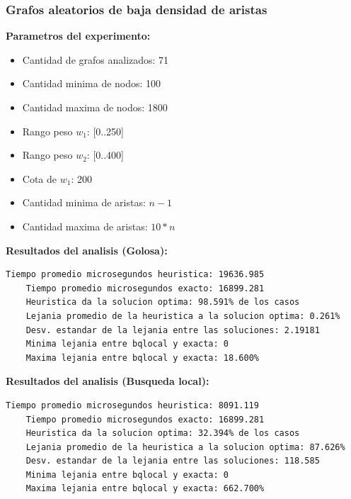 \subsubsection{Grafos aleatorios de baja densidad de aristas}
\textbf{Parametros del experimento:}
\begin{itemize}
	\item Cantidad de grafos analizados: 71
	\item Cantidad minima de nodos: 100
	\item Cantidad maxima de nodos: 1800
	\item Rango peso $w_1$: [0..250]
	\item Rango peso $w_2$: [0..400]
	\item Cota de $w_1$: 200
	\item Cantidad minima de aristas: $n-1$
	\item Cantidad maxima de aristas: $10*n$
\end{itemize}

\vspace{1cm}

\textbf{Resultados del analisis (Golosa):}
\begin{lstlisting}[frame=single]	
	Tiempo promedio microsegundos heuristica: 19636.985
	Tiempo promedio microsegundos exacto: 16899.281
	Heuristica da la solucion optima: 98.591% de los casos
	Lejania promedio de la heuristica a la solucion optima: 0.261%
	Desv. estandar de la lejania entre las soluciones: 2.19181
	Minima lejania entre bqlocal y exacta: 0
	Maxima lejania entre bqlocal y exacta: 18.600%
\end{lstlisting}

\textbf{Resultados del analisis (Busqueda local):}
\begin{lstlisting}[frame=single]	
	Tiempo promedio microsegundos heuristica: 8091.119
	Tiempo promedio microsegundos exacto: 16899.281
	Heuristica da la solucion optima: 32.394% de los casos
	Lejania promedio de la heuristica a la solucion optima: 87.626%
	Desv. estandar de la lejania entre las soluciones: 118.585
	Minima lejania entre bqlocal y exacta: 0
	Maxima lejania entre bqlocal y exacta: 662.700%
\end{lstlisting}

\vspace{2cm}

